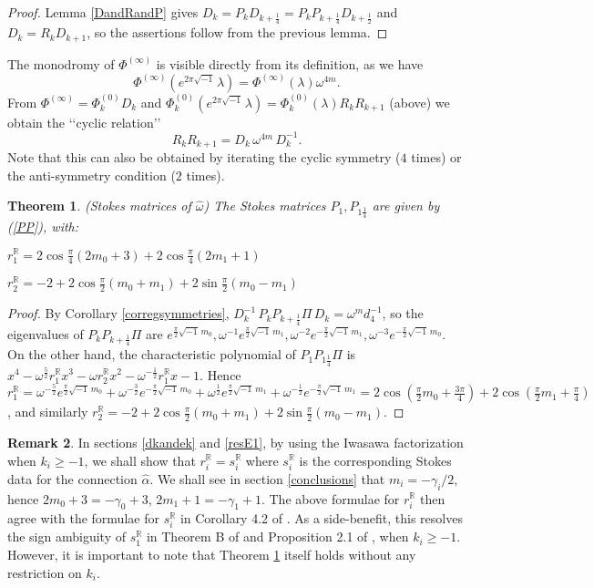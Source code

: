 \documentclass[a4paper,12pt,leqno]{amsart}
\numberwithin{equation}{section}
\theoremstyle{plain}
\newtheorem{theorem}{Theorem}[section]
\theoremstyle{definition}
\newtheorem{remark}[theorem]{Remark}
\newcommand{\R}{\mathbb R}
\newcommand{\al}{\alpha}
\newcommand{\ga}{\gamma}
\newcommand{\la}{\lambda}
\newcommand{\om}{\omega}
\renewcommand{\ll}{\lq\lq}
\newcommand{\rr}{\rq\rq\ }
\renewcommand{\i}{ {\scriptscriptstyle\sqrt{-1}}\, }
\newcommand{\Phiz}{\Phi^{(0)}}
\newcommand{\Phii}{\Phi^{(\infty)}}
\newcommand{\nn}{m}
\begin{document}
\begin{proof} Lemma \ref{DandRandP} gives $D_k=P_k D_{k+\frac14} = 
P_k P_{k+\frac14} D_{k+\frac12}$ and $D_k=R_k D_{k+1}$, so
the assertions follow from the previous lemma.
\end{proof} 

The monodromy of $\Phii$ is visible directly from its definition, as we have
\[
\Phii(e^{2\pi\i}\la)=\Phii(\la) \om^{4\nn}.
\]
From $\Phii=\Phiz_k D_k$ and 
$\Phiz_k(e^{2\pi \i}\la)=\Phiz_k(\la)R_kR_{k+1}$ (above) we obtain
the \ll cyclic relation\rr
\[
R_kR_{k+1} = D_k \, \om^{4\nn} \, D_k^{-1}.
\]
Note that this can also be obtained by iterating the cyclic symmetry ($4$ times) or the anti-symmetry condition ($2$ times).  

\begin{theorem}\label{stokesomegahat} {\em (Stokes matrices of $\hat\om$)}
The Stokes matrices
$P_1,P_{1\scriptstyle\frac14}$
are given by (\ref{PP}), with:

$r_1^\R=2\cos\tfrac\pi4(2\nn_0 + 3)+
2\cos\tfrac\pi4(2\nn_1 + 1)$

$r_2^\R=-2 + 2\cos\tfrac\pi2(\nn_0+\nn_1) + 2\sin\tfrac\pi2(\nn_0-\nn_1)$
\end{theorem}

\begin{proof}  By Corollary \ref{corregsymmetries}, 
$D_k^{-1}\, P_kP_{k+\frac14}\Pi \, D_k =  \om^\nn d_4^{-1}$,
so the eigenvalues of $P_kP_{k+\frac14}\Pi$ are 
$e^{\frac\pi2 \i \nn_0},
\om^{-1} e^{\frac\pi2 \i \nn_1},
\om^{-2} e^{-\frac\pi2 \i \nn_1},
\om^{-3} e^{-\frac\pi2 \i \nn_0}
$. On the other hand, the characteristic polynomial of $P_1P_{1\frac14}\Pi$
is $x^4 - \om^{\frac52} r_1^\R x^3 - \om r_2^\R x^2 - \om^{-\frac12} r_1^\R x - 1$.
Hence
$r_1^\R= 
\om^{-\frac52} e^{\frac\pi2 \i \nn_0}+\om^{-\frac32} e^{-\frac\pi2 \i \nn_0}+
\om^{\frac12} e^{\frac\pi2 \i \nn_1}+\om^{-\frac12} e^{-\frac\pi2 \i \nn_1}
=
2\cos\left(  \tfrac\pi2 \nn_0 + \tfrac{3\pi}4 \right)+
2\cos\left(  \tfrac\pi2 \nn_1 + \tfrac{\pi}4 \right)$, and similarly
$r_2^\R=
-2 + 2\cos\tfrac\pi2(\nn_0+\nn_1) + 2\sin\tfrac\pi2(\nn_0-\nn_1)$.
\end{proof}

\begin{remark} 
In sections \ref{dkandek} and \ref{resE1},
by using the Iwasawa factorization when $k_i\ge-1$, we shall show that $r_i^\R=s_i^\R$ where $s_i^\R$ is the corresponding Stokes data  for the connection $\hat\al$.  We shall see in section \ref{conclusions} that $\nn_i=-\ga_i/2$, hence $2\nn_0+3=-\ga_0+3$, $2\nn_1+1=-\ga_1+1$. 
The above formulae for $r_i^\R$ then agree with 
the formulae for $s_i^\R$ in Corollary 4.2 of \cite{GuItLi15}.  As a side-benefit, this resolves the sign ambiguity of $s_1^\R$ in Theorem B of \cite{GuItLiXX}
and Proposition 2.1 of \cite{GuLi12}, when $k_i\ge-1$.  However, it is important to note that Theorem \ref{stokesomegahat} itself holds without any restriction on $k_i$.
\end{remark}
\end{document}
